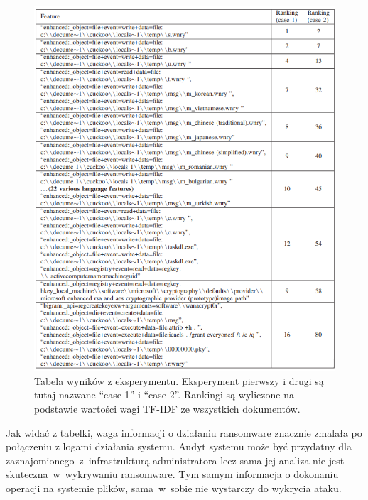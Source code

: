 \begin{figure}[H]
    \centering
    \includegraphics[width=0.85\linewidth]{rysunki/failed-exp.png}
    \caption{Tabela wyników z eksperymentu. Eksperyment pierwszy i drugi są tutaj nazwane \foreignquote{english}{case 1} i \foreignquote{english}{case 2}.
    Rankingi są wyliczone na podstawie wartości wagi TF-IDF ze wszystkich dokumentów\protect\footnotemark.}
    \label{fig:enter-label}
\end{figure}

Jak widać z tabelki, waga informacji o działaniu ransomware znacznie zmalała po połączeniu
z logami działania systemu. Audyt systemu może być przydatny dla zaznajomionego~z~infrastrukturą
administratora lecz sama jej analiza nie jest skuteczna~w~wykrywaniu ransomware. Tym samym
informacja o dokonaniu operacji na systemie plików, sama~w~sobie nie wystarczy do wykrycia ataku.
